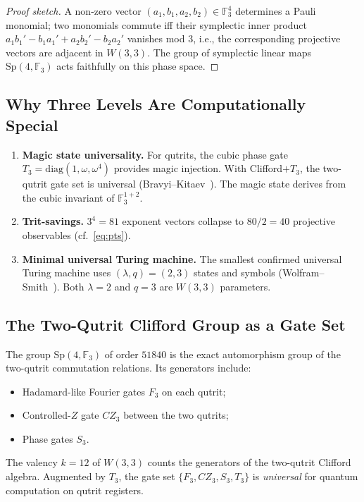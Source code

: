 ﻿\documentclass[12pt]{article}
\newcommand{\FF}{\mathbb{F}}
\newcommand{\Sp}{\mathrm{Sp}}
\newcommand{\GF}[1]{\mathbb{F}_{#1}}
\begin{document}
\begin{proof}[Proof sketch]
A non-zero vector $(a_1,b_1,a_2,b_2) \in \GF{3}^4$ determines a Pauli monomial; two
monomials commute iff their symplectic inner product
$a_1 b_1' - b_1 a_1' + a_2 b_2' - b_2 a_2'$ vanishes mod $3$, i.e., the
corresponding projective vectors are adjacent in $W(3,3)$.  The group of symplectic
linear maps $\Sp(4,\FF_3)$ acts faithfully on this phase space.
\end{proof}

\subsection{Why Three Levels Are Computationally Special}

\begin{enumerate}[label=(\alph*)]
  \item \textbf{Magic state universality.}  For qutrits, the cubic phase gate
    $T_3 = \mathrm{diag}(1, \omega, \omega^4)$ provides magic injection.  With
    Clifford$+T_3$, the two-qutrit gate set is universal (Bravyi--Kitaev~\cite{BK2005}).
    The magic state derives from the cubic invariant of $\GF{3}^{1+2}$.
  \item \textbf{Trit-savings.}  $3^4 = 81$ exponent vectors collapse to
    $80/2 = 40$ projective observables (cf.\ \cref{eq:pts}).
  \item \textbf{Minimal universal Turing machine.}  The smallest confirmed universal
    Turing machine uses $(\lambda, q) = (2, 3)$ states and symbols
    (Wolfram--Smith~\cite{Smith2007}).  Both $\lambda = 2$ and $q = 3$ are $W(3,3)$
    parameters.
\end{enumerate}

\subsection{The Two-Qutrit Clifford Group as a Gate Set}

The group $\Sp(4,\FF_3)$ of order $51840$ is the exact automorphism group of the
two-qutrit commutation relations.  Its generators include:
\begin{itemize}[noitemsep]
  \item Hadamard-like Fourier gates $F_3$ on each qutrit;
  \item Controlled-$Z$ gate $CZ_3$ between the two qutrits;
  \item Phase gates $S_3$.
\end{itemize}
The valency $k = 12$ of $W(3,3)$ counts the generators of the two-qutrit Clifford
algebra.  Augmented by $T_3$, the gate set $\{F_3, CZ_3, S_3, T_3\}$ is
\emph{universal} for quantum computation on qutrit registers.
\end{document}
